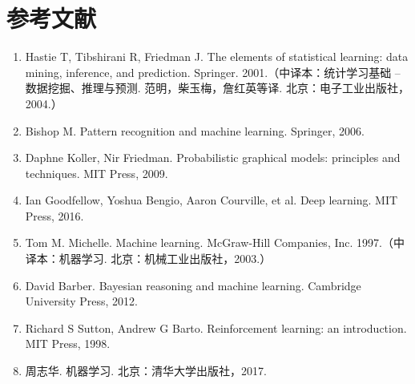 \documentclass[UTF8, 12pt, fontset=fandol, oneside]{ctexart}
\begin{document}
\section*{参考文献}

\begin{enumerate}
  \item Hastie T, Tibshirani R, Friedman J. The elements of statistical learning: data mining, inference, and prediction. Springer. 2001.（中译本：统计学习基础 -- 数据挖掘、推理与预测. 范明，柴玉梅，詹红英等译. 北京：电子工业出版社，2004.）
  \item Bishop M. Pattern recognition and machine learning. Springer, 2006.
  \item Daphne Koller, Nir Friedman. Probabilistic graphical models: principles and techniques. MIT Press, 2009.
  \item Ian Goodfellow, Yoshua Bengio, Aaron Courville, et al. Deep learning. MIT Press, 2016.
  \item Tom M. Michelle. Machine learning. McGraw-Hill Companies, Inc. 1997.（中译本：机器学习. 北京：机械工业出版社，2003.）
  \item David Barber. Bayesian reasoning and machine learning. Cambridge University Press, 2012.
  \item Richard S Sutton, Andrew G Barto. Reinforcement learning: an introduction. MIT Press, 1998.
  \item 周志华. 机器学习. 北京：清华大学出版社，2017.
\end{enumerate}
\end{document}
